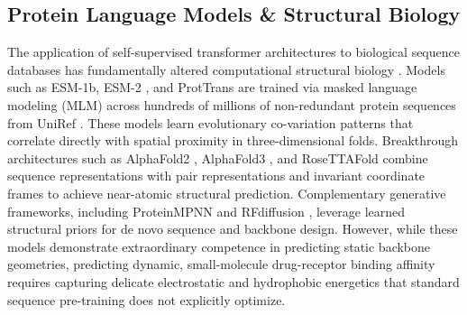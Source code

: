 \documentclass{article}
\theoremstyle{definition}
\begin{document}
\subsection{Protein Language Models \& Structural Biology}
The application of self-supervised transformer architectures to biological sequence databases has fundamentally altered computational structural biology \citep{vaswani2017attention,rives2021biological}. Models such as ESM-1b, ESM-2 \citep{lin2023evolutionary}, and ProtTrans \citep{elnaggar2021prottrans} are trained via masked language modeling (MLM) across hundreds of millions of non-redundant protein sequences from UniRef \citep{uniprot2023uniprot}. These models learn evolutionary co-variation patterns that correlate directly with spatial proximity in three-dimensional folds. Breakthrough architectures such as AlphaFold2 \citep{jumper2021highly}, AlphaFold3 \citep{abramson2024accurate}, and RoseTTAFold \citep{baek2021accurate} combine sequence representations with pair representations and invariant coordinate frames to achieve near-atomic structural prediction. Complementary generative frameworks, including ProteinMPNN \citep{dauparas2022robust} and RFdiffusion \citep{watson2023novo}, leverage learned structural priors for de novo sequence and backbone design. However, while these models demonstrate extraordinary competence in predicting static backbone geometries, predicting dynamic, small-molecule drug-receptor binding affinity requires capturing delicate electrostatic and hydrophobic energetics that standard sequence pre-training does not explicitly optimize.
\end{document}
